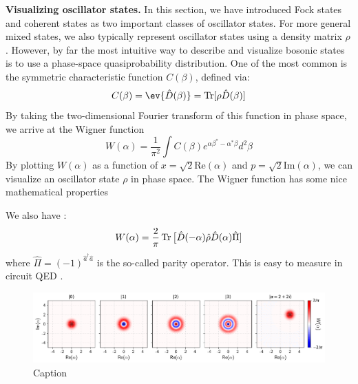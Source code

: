 \noindent \textbf{Visualizing oscillator states.} In this section, we have introduced Fock states and coherent states as two important classes of oscillator states. For more general mixed states, we also typically represent oscillator states using a density matrix $\rho$. However, by far the most intuitive way to describe and visualize bosonic states is to use a phase-space quasiprobability distribution. One of the most common is the symmetric characteristic function $C(\beta)$, defined via: 
\begin{equation}
    C(\beta) = \ev{\hat{D}(\beta)} = \Tr[\rho \hat{D}(\beta)] 
\end{equation}
By taking the two-dimensional Fourier transform of this function in phase space, we arrive at the Wigner function
\begin{equation}
    W(\alpha) = \frac{1}{\pi^2}\int C(\beta) e^{\alpha\beta^\ast - \alpha^\ast\beta} d^2\beta
\end{equation}
By plotting $W(\alpha)$ as a function of $x = \sqrt{2}\mathrm{Re}(\alpha)$ and $p = \sqrt{2}\mathrm{Im}(\alpha)$, we can visualize an oscillator state $\rho$ in phase space. The Wigner function has some nice mathematical properties 

We also have \cite{royer1977wigner}:
\begin{equation}
    W(\alpha) = \frac{2}{\pi}\operatorname{Tr}\big[\hat{D}(-\alpha)\hat{\rho}\hat{D}(\alpha)\hat{\Pi}]
\end{equation}
where $\hat{\Pi} = (-1)^{\hat{a}^\dagger\hat{a}}$ is the so-called parity operator. This is easy to measure in circuit QED \cite{sun2014tracking}. 

\begin{figure}
    \centering
    \includegraphics[width=\linewidth]{Figures/2/Fock_Wigners.pdf}
    \caption{Caption}
    \label{fig:2_Fock_Wigners}
\end{figure}

